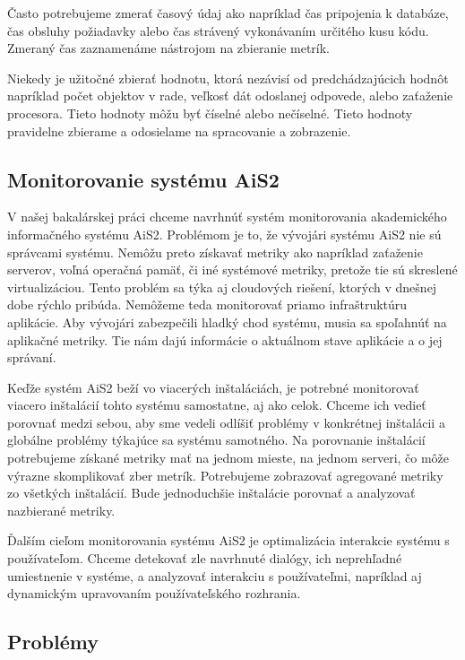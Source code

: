 \documentclass[a4paper, usesections, upjsfrontpage, thesismargins, thesislinespacing, twoside]{rnthesissvk}
\begin{document}
Často potrebujeme zmerať časový údaj ako napríklad čas pripojenia k databáze, čas obsluhy požiadavky alebo čas strávený vykonávaním určitého kusu kódu. Zmeraný čas zaznamenáme nástrojom na zbieranie metrík.

Niekedy je užitočné zbierať hodnotu, ktorá nezávisí od predchádzajúcich hodnôt napríklad počet objektov v rade, veľkosť dát odoslanej odpovede, alebo zaťaženie procesora. 
Tieto hodnoty môžu byť číselné alebo nečíselné. Tieto hodnoty pravidelne zbierame a odosielame na spracovanie a zobrazenie.

\subsection{Monitorovanie systému AiS2}

V našej bakalárskej práci chceme navrhnúť systém monitorovania akademického informačného systému AiS2.
Problémom je to, že vývojári systému AiS2 nie sú správcami systému.
Nemôžu preto získavať metriky ako napríklad zaťaženie serverov, voľná operačná pamäť, či iné systémové metriky, pretože tie sú skreslené virtualizáciou.
Tento problém sa týka aj cloudových riešení, ktorých v dnešnej dobe rýchlo pribúda.
Nemôžeme teda monitorovať priamo infraštruktúru aplikácie.
Aby vývojári zabezpečili hladký chod systému, musia sa spoľahnúť na aplikačné metriky.
Tie nám dajú informácie o aktuálnom stave aplikácie a o jej správaní.

Keďže systém AiS2 beží vo viacerých inštaláciách, 
	je potrebné monitorovať viacero inštalácií tohto systému samostatne, aj ako celok.
Chceme ich vedieť porovnať medzi sebou, 
	aby sme vedeli odlíšiť problémy v konkrétnej inštalácii a globálne problémy týkajúce sa systému samotného.
Na porovnanie inštalácií potrebujeme získané metriky mať na jednom mieste, na jednom serveri, čo môže výrazne skomplikovať zber metrík.
Potrebujeme zobrazovať agregované metriky zo všetkých inštalácií.
Bude jednoduchšie inštalácie porovnať a analyzovať nazbierané metriky.

Ďalším cieľom monitorovania systému AiS2 je optimalizácia interakcie systému s používateľom.
Chceme detekovať zle navrhnuté dialógy, ich neprehľadné umiestnenie v systéme, a analyzovať interakciu s používateľmi, napríklad aj dynamickým upravovaním používateľského rozhrania.

\subsection{Problémy}
\end{document}

